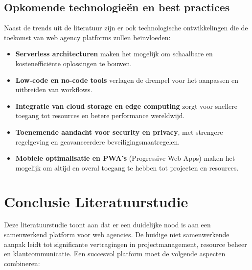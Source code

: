 \subsection{Opkomende technologieën en best practices}
Naast de trends uit de literatuur zijn er ook technologische ontwikkelingen die de toekomst van web agency platforms zullen beïnvloeden:
\begin{itemize}
    \item \textbf{Serverless architecturen} maken het mogelijk om schaalbare en kostenefficiënte oplossingen te bouwen.
    \item \textbf{Low-code en no-code tools} verlagen de drempel voor het aanpassen en uitbreiden van workflows.
    \item \textbf{Integratie van cloud storage en edge computing} zorgt voor snellere toegang tot resources en betere performance wereldwijd.
    \item \textbf{Toenemende aandacht voor security en privacy}, met strengere regelgeving en geavanceerdere beveiligingsmaatregelen.
    \item \textbf{Mobiele optimalisatie en PWA's} (Progressive Web Apps) maken het mogelijk om altijd en overal toegang te hebben tot projecten en resources.
\end{itemize}

\section{Conclusie Literatuurstudie}
\label{sec:conclusie}

Deze literatuurstudie toont aan dat er een duidelijke nood is aan een samenwerkend platform voor web agencies. De huidige niet samenwerkende aanpak leidt tot significante vertragingen in projectmanagement, resource beheer en klantcommunicatie. Een succesvol platform moet de volgende aspecten combineren:

